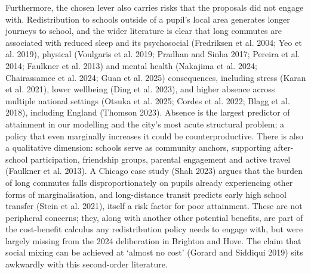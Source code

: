 \documentclass[
  12pt,
  titlepage]{article}
\begin{document}
Furthermore, the chosen lever also carries risks that the proposals did
not engage with. Redistribution to schools outside of a pupil's local
area generates longer journeys to school, and the wider literature is
clear that long commutes are associated with reduced sleep and its
psychosocial (Fredriksen et al. 2004; Yeo et al. 2019), physical
(Voulgaris et al. 2019; Pradhan and Sinha 2017; Pereira et al. 2014;
Faulkner et al. 2013) and mental health (Nakajima et al. 2024;
Chairassamee et al. 2024; Guan et al. 2025) consequences, including
stress (Karan et al. 2021), lower wellbeing (Ding et al. 2023), and
higher absence across multiple national settings (Otsuka et al. 2025;
Cordes et al. 2022; Blagg et al. 2018), including England (Thomson
2023). Absence is the largest predictor of attainment in our modelling
and the city's most acute structural problem; a policy that even
marginally increases it could be counterproductive. There is also a
qualitative dimension: schools serve as community anchors, supporting
after-school participation, friendship groups, parental engagement and
active travel (Faulkner et al. 2013). A Chicago case study (Shah 2023)
argues that the burden of long commutes falls disproportionately on
pupils already experiencing other forms of marginalisation, and
long-distance transit predicts early high school transfer (Stein et al.
2021), itself a risk factor for poor attainment. These are not
peripheral concerns; they, along with another other potential benefits,
are part of the cost-benefit calculus any redistribution policy needs to
engage with, but were largely missing from the 2024 deliberation in
Brighton and Hove. The claim that social mixing can be achieved at
`almost no cost' (Gorard and Siddiqui 2019) sits awkwardly with this
second-order literature.
\end{document}
